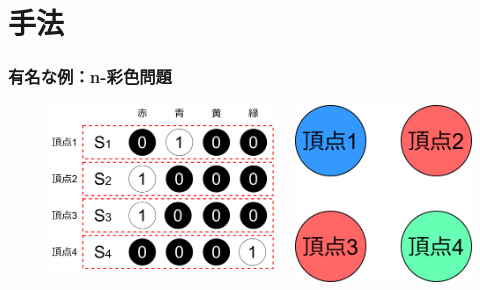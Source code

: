\section{手法}
\begin{frame}
  \frametitle{有名な例：n-彩色問題}
  \begin{figure}[h]
    \begin{columns}
      \begin{column}{0.55\linewidth}        
        \includegraphics[width=0.9\linewidth]{data/GCP_example}
      \end{column}
      \begin{column}{0.45\linewidth}
        \centering
        \includegraphics[width=0.5\linewidth]{data/GCP_example_graph}    
      \end{column}
    \end{columns}
  \end{figure}
\end{frame}

